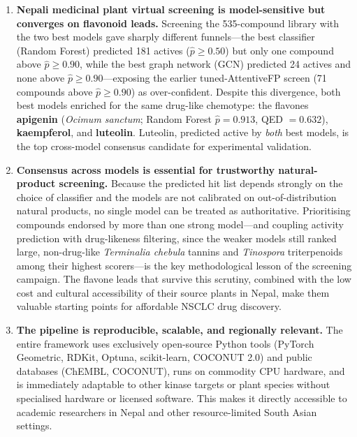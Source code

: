 \begin{enumerate}
    \item \textbf{Nepali medicinal plant virtual screening is model-sensitive but
          converges on flavonoid leads.} Screening the 535-compound library with the
          two best models gave sharply different funnels---the best classifier
          (Random Forest) predicted 181 actives ($\hat{p} \geq 0.50$) but only one
          compound above $\hat{p} \geq 0.90$, while the best graph network (GCN)
          predicted 24 actives and none above $\hat{p} \geq 0.90$---exposing the
          earlier tuned-AttentiveFP screen (71 compounds above $\hat{p} \geq 0.90$) as
          over-confident. Despite this divergence, both best models enriched for the
          same drug-like chemotype: the flavones \textbf{apigenin} (\textit{Ocimum
          sanctum}; Random Forest $\hat{p} = 0.913$, QED $= 0.632$), \textbf{kaempferol},
          and \textbf{luteolin}. Luteolin, predicted active by \emph{both} best models,
          is the top cross-model consensus candidate for experimental validation.

    \item \textbf{Consensus across models is essential for trustworthy natural-product
          screening.} Because the predicted hit list depends strongly on the choice of
          classifier and the models are not calibrated on out-of-distribution natural
          products, no single model can be treated as authoritative. Prioritising
          compounds endorsed by more than one strong model---and coupling activity
          prediction with drug-likeness filtering, since the weaker models still
          ranked large, non-drug-like \textit{Terminalia chebula} tannins and
          \textit{Tinospora} triterpenoids among their highest scorers---is the key
          methodological lesson of the screening campaign. The flavone leads that survive this scrutiny, combined
          with the low cost and cultural accessibility of their source plants in Nepal,
          make them valuable starting points for affordable NSCLC drug discovery.

    \item \textbf{The pipeline is reproducible, scalable, and regionally relevant.}
          The entire framework uses exclusively open-source Python tools (PyTorch
          Geometric, RDKit, Optuna, scikit-learn, COCONUT 2.0) and public databases
          (ChEMBL, COCONUT), runs on commodity CPU hardware, and is immediately
          adaptable to other kinase targets or plant species without specialised
          hardware or licensed software. This makes it directly accessible to academic
          researchers in Nepal and other resource-limited South Asian settings.
\end{enumerate}

